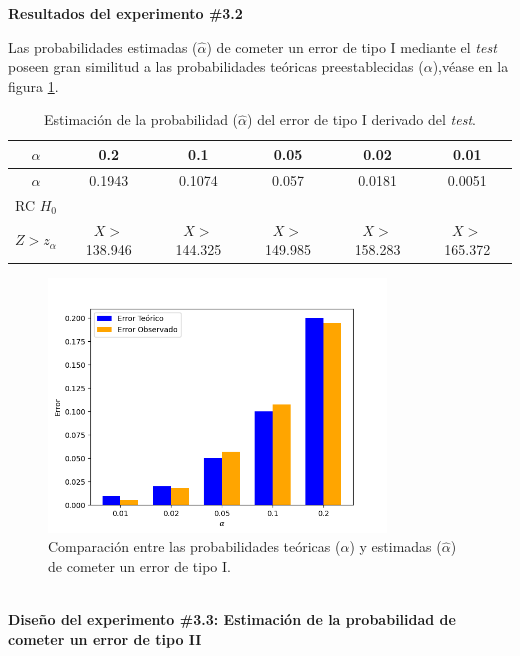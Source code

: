 \documentclass[12pt]{report}
\begin{document}
\textbf{Resultados del experimento \#3.2}

Las probabilidades estimadas ($\hat{\alpha}$) de cometer un error de tipo I  mediante el \textit{test} poseen gran similitud  a las probabilidades teóricas preestablecidas ($\alpha$),véase en la figura \ref{Teorico vs Observado3}.
\begin{table}[h!]
	\centering
	\begin{tabular}{|c|ccccc|}
		\hline
		$\alpha$ & 0.2 &   0.1 &  0.05 &  0.02 &  0.01 \\
		\hline
		$\hat{\alpha}$ & 0.1943 & 0.1074 & 0.057 & 0.0181 & 0.0051 \\
		\hline
	RC $H_0$ 		&		&		&		&		&\\
		$Z>z_\alpha$&  $X>$138.946& $X>$144.325& $X>$149.985& $X>$158.283& $X>$165.372\\	
		\hline
	\end{tabular}
	\caption{Estimación de la probabilidad ($\hat{\alpha}$) del error de tipo I derivado del \textit{test}.}
	\label{tab3:error1-prob1}
\end{table}
\begin{figure}[ht]
	\centering
	
	\includegraphics[width=0.8\textwidth]{5td_teo_obs.png}
	\caption{Comparación entre las probabilidades teóricas ($\alpha$) y estimadas ($\hat{\alpha}$) de cometer un error de tipo I. }
	\label{Teorico vs Observado3}
\end{figure}\\

\textbf{Diseño del experimento \#3.3: Estimación de la probabilidad de cometer un error de tipo II}
\end{document}
